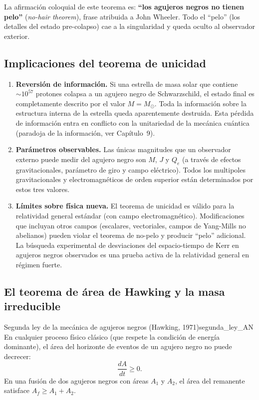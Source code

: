 La afirmación coloquial de este teorema es: \textbf{``los agujeros negros no tienen pelo''} (\textit{no-hair theorem}), frase atribuida a John Wheeler. Todo el ``pelo'' (los detalles del estado pre-colapso) cae a la singularidad y queda oculto al observador exterior.

\subsection{Implicaciones del teorema de unicidad}

\begin{enumerate}[leftmargin=2em, label=\textbf{\arabic*.}]

\item \textbf{Reversión de información.} Si una estrella de masa solar que contiene $\sim 10^{57}$ protones colapsa a un agujero negro de Schwarzschild, el estado final es completamente descrito por el valor $M = M_\odot$. Toda la información sobre la estructura interna de la estrella queda aparentemente destruida. Esta pérdida de información entra en conflicto con la unitariedad de la mecánica cuántica (paradoja de la información, ver Capítulo~9).

\item \textbf{Parámetros observables.} Las únicas magnitudes que un observador externo puede medir del agujero negro son $M$, $J$ y $Q_e$ (a través de efectos gravitacionales, parámetro de giro y campo eléctrico). Todos los multipoles gravitacionales y electromagnéticos de orden superior están determinados por estos tres valores.

\item \textbf{Límites sobre física nueva.} El teorema de unicidad es válido para la relatividad general estándar (con campo electromagnético). Modificaciones que incluyan otros campos (escalares, vectoriales, campos de Yang-Mills no abelianos) pueden violar el teorema de no-pelo y producir ``pelo'' adicional. La búsqueda experimental de desviaciones del espacio-tiempo de Kerr en agujeros negros observados es una prueba activa de la relatividad general en régimen fuerte.

\end{enumerate}

\subsection{El teorema de área de Hawking y la masa irreducible}

\begin{teorema}{Segunda ley de la mecánica de agujeros negros (Hawking, 1971)}{segunda_ley_AN}
En cualquier proceso físico clásico (que respete la condición de energía dominante), el área del horizonte de eventos de un agujero negro no puede decrecer:
\begin{equation}
  \frac{dA}{dt} \geq 0.
  \label{eq:segunda_ley_AN}
\end{equation}
En una fusión de dos agujeros negros con áreas $A_1$ y $A_2$, el área del remanente satisface $A_f \geq A_1 + A_2$.
\end{teorema}

